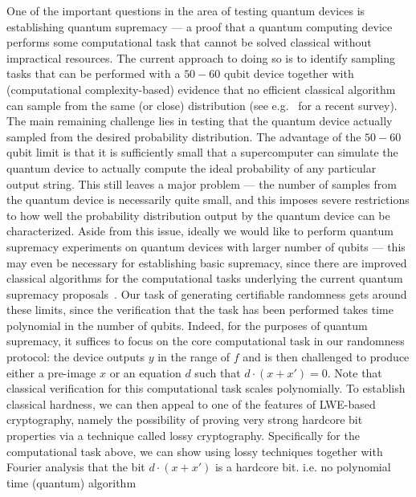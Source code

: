 \documentclass[11pt]{article}
\theoremstyle{remark}
\theoremstyle{definition}
\begin{document}
\medskip

One of the important questions in the area of testing quantum devices is establishing quantum supremacy --- a proof that a quantum computing device performs some 
computational task that cannot be solved classical without impractical resources. The current approach to doing so is to identify sampling tasks that can be performed with
a $50-60$ qubit device together with (computational complexity-based) evidence that no efficient classical algorithm can sample from the same (or close) distribution (see e.g.~\cite{harrow2017quantum} for a recent survey). The main remaining challenge lies in testing that the quantum device actually sampled from the desired probability distribution. The advantage of the $50-60$ qubit limit is that it is sufficiently small that a supercomputer can simulate the quantum device to actually compute the ideal probability of any particular output string. This still leaves a major problem --- the number of samples from the quantum device is necessarily quite small, and this imposes severe restrictions to how well the probability distribution output by the quantum device can be characterized. Aside from this issue,
ideally we would like to perform quantum supremacy experiments on quantum devices with larger number of qubits --- 
this may even be necessary for establishing basic supremacy, since there are improved classical algorithms for the computational tasks underlying the current quantum supremacy proposals~\cite{pednault2017breaking,clifford2018classical}. Our task of generating certifiable randomness gets around these limits, since the verification that the task has been performed takes time polynomial in the number of qubits. Indeed, for the purposes of quantum supremacy, it suffices to focus on the core computational task in our randomness protocol: the device outputs $y$ in the range of $f$ and is then challenged to produce either a pre-image $x$ or an equation $d$ such that  $d\cdot(x + x') = 0$. Note that classical verification for this computational task
scales polynomially. To establish classical hardness, we can then appeal to one of the features of LWE-based cryptography, namely the possibility of proving very strong hardcore bit properties via a technique called lossy cryptography. Specifically for the computational task above, we can show using lossy techniques together with Fourier analysis that the bit $d\cdot(x + x')$ is a hardcore bit. i.e. no polynomial time (quantum) algorithm 
\end{document}
